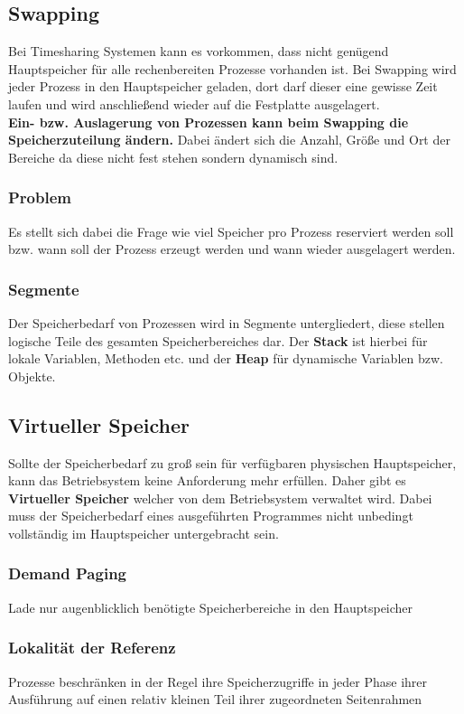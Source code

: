 \documentclass[10pt,a4paper]{article}
\begin{document}
\begin{multicols*}{4}
\subsection{Swapping}
Bei Timesharing Systemen kann es vorkommen, dass nicht genügend Hauptspeicher für alle rechenbereiten Prozesse vorhanden
ist. Bei Swapping wird jeder Prozess in den Hauptspeicher geladen, dort darf dieser eine gewisse Zeit laufen und wird
anschließend wieder auf die Festplatte ausgelagert. \\
\textbf{Ein- bzw. Auslagerung von Prozessen kann beim Swapping die Speicherzuteilung ändern.} Dabei ändert sich die
Anzahl, Größe und Ort der Bereiche da diese nicht fest stehen sondern dynamisch sind.

\subsubsection*{Problem}
Es stellt sich dabei die Frage wie viel Speicher pro Prozess reserviert werden soll bzw. wann soll der Prozess erzeugt
werden und wann wieder ausgelagert werden.

\subsubsection*{Segmente}
Der Speicherbedarf von Prozessen wird in Segmente untergliedert, diese stellen logische Teile des gesamten
Speicherbereiches dar. Der \textbf{Stack} ist hierbei für lokale Variablen, Methoden etc. und der \textbf{Heap} für
dynamische Variablen bzw. Objekte.

\subsection{Virtueller Speicher}
Sollte der Speicherbedarf zu groß sein für verfügbaren physischen Hauptspeicher, kann das Betriebsystem keine
Anforderung mehr erfüllen. Daher gibt es \textbf{Virtueller Speicher} welcher von dem Betriebsystem verwaltet wird.
Dabei muss der Speicherbedarf eines ausgeführten Programmes nicht unbedingt vollständig im Hauptspeicher untergebracht
sein.

\subsubsection*{Demand Paging}
Lade nur augenblicklich benötigte Speicherbereiche in den Hauptspeicher

\subsubsection*{Lokalität der Referenz}
Prozesse beschränken in der Regel ihre Speicherzugriffe in jeder Phase ihrer Ausführung auf einen relativ kleinen Teil
ihrer zugeordneten Seitenrahmen


\end{multicols*}
\end{document}
